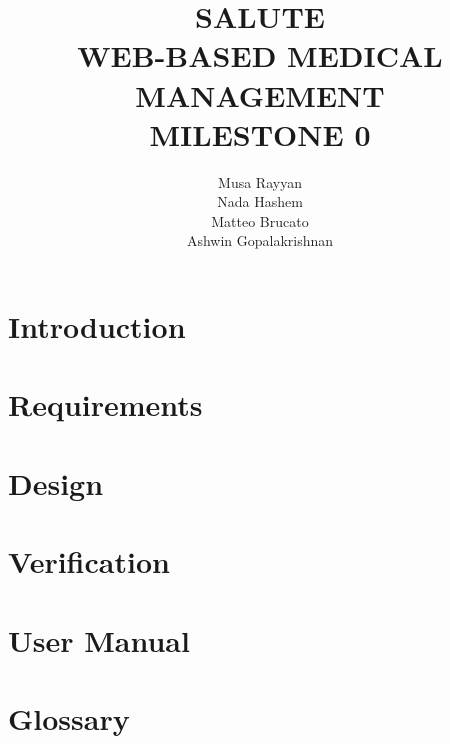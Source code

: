 \documentclass[10pt]{report}
\title{SALUTE \\ WEB-BASED MEDICAL MANAGEMENT \\ MILESTONE 0}
\author{Musa Rayyan \\ Nada Hashem \\ Matteo Brucato \\ Ashwin Gopalakrishnan}
\begin{document}
\maketitle
\tableofcontents

\part{Introduction}


\part{Requirements}


\part{Design}


\part{Verification}


\part{User Manual}


\part{Glossary}


\appendix

\end{document}
